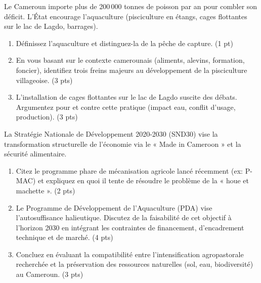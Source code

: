 \documentclass[11pt]{article}
\begin{document}
\begin{exercice}
Le Cameroun importe plus de 200\,000 tonnes de poisson par an pour combler son déficit. L'État encourage l'aquaculture (pisciculture en étangs, cages flottantes sur le lac de Lagdo, barrages).

\begin{enumerate}
    \item Définissez l'aquaculture et distinguez-la de la pêche de capture. \hfill (1 pt)
    \item En vous basant sur le contexte camerounais (aliments, alevins, formation, foncier), identifiez trois freins majeurs au développement de la pisciculture villageoise. \hfill (3 pts)
    \item L'installation de cages flottantes sur le lac de Lagdo suscite des débats. Argumentez pour et contre cette pratique (impact eau, conflit d'usage, production). \hfill (3 pts)
\end{enumerate}
\end{exercice}

\begin{exercice}
La Stratégie Nationale de Développement 2020-2030 (SND30) vise la transformation structurelle de l'économie via le « Made in Cameroon » et la sécurité alimentaire.

\begin{enumerate}
    \item Citez le programme phare de mécanisation agricole lancé récemment (ex: P-MAC) et expliquez en quoi il tente de résoudre le problème de la « houe et machette ». \hfill (2 pts)
    \item Le Programme de Développement de l'Aquaculture (PDA) vise l'autosuffisance halieutique. Discutez de la faisabilité de cet objectif à l'horizon 2030 en intégrant les contraintes de financement, d'encadrement technique et de marché. \hfill (4 pts)
    \item Concluez en évaluant la compatibilité entre l'intensification agropastorale recherchée et la préservation des ressources naturelles (sol, eau, biodiversité) au Cameroun. \hfill (3 pts)
\end{enumerate}
\end{exercice}
\end{document}
